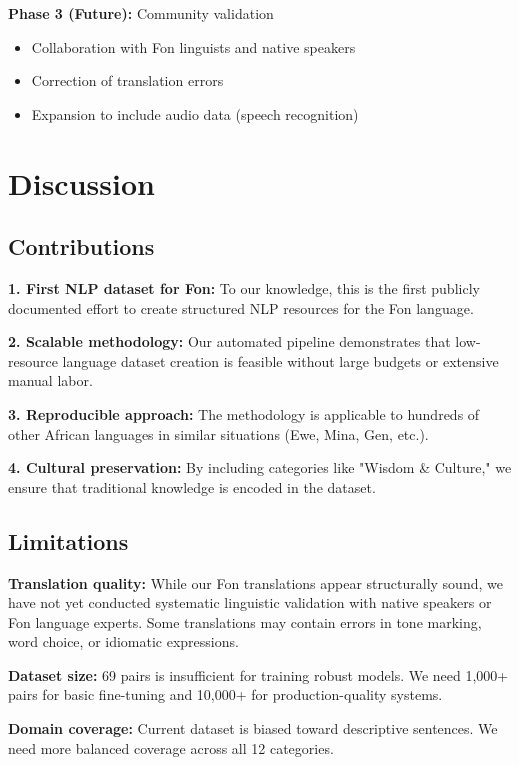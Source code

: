 \documentclass[10pt,twocolumn]{article}
\begin{document}
\textbf{Phase 3 (Future):} Community validation
\begin{itemize}[leftmargin=*,noitemsep,topsep=0pt]
    \item Collaboration with Fon linguists and native speakers
    \item Correction of translation errors
    \item Expansion to include audio data (speech recognition)
\end{itemize}

\section{Discussion}

\subsection{Contributions}

\textbf{1. First NLP dataset for Fon:} To our knowledge, this is the first publicly documented effort to create structured NLP resources for the Fon language.

\textbf{2. Scalable methodology:} Our automated pipeline demonstrates that low-resource language dataset creation is feasible without large budgets or extensive manual labor.

\textbf{3. Reproducible approach:} The methodology is applicable to hundreds of other African languages in similar situations (Ewe, Mina, Gen, etc.).

\textbf{4. Cultural preservation:} By including categories like "Wisdom \& Culture," we ensure that traditional knowledge is encoded in the dataset.

\subsection{Limitations}

\textbf{Translation quality:} While our Fon translations appear structurally sound, we have not yet conducted systematic linguistic validation with native speakers or Fon language experts. Some translations may contain errors in tone marking, word choice, or idiomatic expressions.

\textbf{Dataset size:} 69 pairs is insufficient for training robust models. We need 1,000+ pairs for basic fine-tuning and 10,000+ for production-quality systems.

\textbf{Domain coverage:} Current dataset is biased toward descriptive sentences. We need more balanced coverage across all 12 categories.
\end{document}
